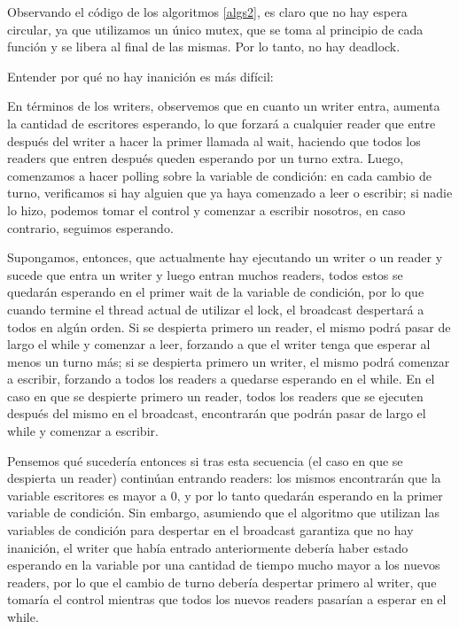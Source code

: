 \documentclass{article}
\begin{document}
Observando el código de los algoritmos \ref{algs2}, es claro que no hay espera circular, ya que utilizamos un único mutex, que se toma al principio de cada función y se libera al final de las mismas. Por lo tanto, no hay deadlock.\par\smallbreak

Entender por qué no hay inanición es más difícil:

En términos de los writers, observemos que en cuanto un writer entra, aumenta la cantidad de escritores esperando, lo que forzará a cualquier reader que entre después del writer a hacer la primer llamada al wait, haciendo que todos los readers que entren después queden esperando por un turno extra. Luego, comenzamos a hacer polling sobre la variable de condición: en cada cambio de turno, verificamos si hay alguien que ya haya comenzado a leer o escribir; si nadie lo hizo, podemos tomar el control y comenzar a escribir nosotros, en caso contrario, seguimos esperando.

Supongamos, entonces, que actualmente hay ejecutando un writer o un reader y sucede que entra un writer y luego entran muchos readers, todos estos se quedarán esperando en el primer wait de la variable de condición, por lo que cuando termine el thread actual de utilizar el lock, el broadcast despertará a todos en algún orden. Si se despierta primero un reader, el mismo podrá pasar de largo el while y comenzar a leer, forzando a que el writer tenga que esperar al menos un turno más; si se despierta primero un writer, el mismo podrá comenzar a escribir, forzando a todos los readers a quedarse esperando en el while. En el caso en que se despierte primero un reader, todos los readers que se ejecuten después del mismo en el broadcast, encontrarán que podrán pasar de largo el while y comenzar a escribir.

Pensemos qué sucedería entonces si tras esta secuencia (el caso en que se despierta un reader) continúan entrando readers: los mismos encontrarán que la variable escritores es mayor a 0, y por lo tanto quedarán esperando en la primer variable de condición. Sin embargo, asumiendo que el algoritmo que utilizan las variables de condición para despertar en el broadcast garantiza que no hay inanición, el writer que había entrado anteriormente debería haber estado esperando en la variable por una cantidad de tiempo mucho mayor a los nuevos readers, por lo que el cambio de turno debería despertar primero al writer, que tomaría el control mientras que todos los nuevos readers pasarían a esperar en el while.
\end{document}
